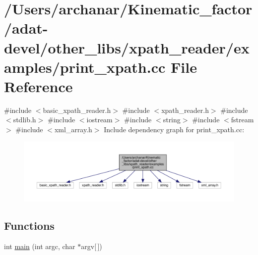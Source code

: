 \hypertarget{adat-devel_2other__libs_2xpath__reader_2examples_2print__xpath_8cc}{}\section{/\+Users/archanar/\+Kinematic\+\_\+factor/adat-\/devel/other\+\_\+libs/xpath\+\_\+reader/examples/print\+\_\+xpath.cc File Reference}
\label{adat-devel_2other__libs_2xpath__reader_2examples_2print__xpath_8cc}
{\ttfamily \#include $<$basic\+\_\+xpath\+\_\+reader.\+h$>$}\newline
{\ttfamily \#include $<$xpath\+\_\+reader.\+h$>$}\newline
{\ttfamily \#include $<$stdlib.\+h$>$}\newline
{\ttfamily \#include $<$iostream$>$}\newline
{\ttfamily \#include $<$string$>$}\newline
{\ttfamily \#include $<$fstream$>$}\newline
{\ttfamily \#include $<$xml\+\_\+array.\+h$>$}\newline
Include dependency graph for print\+\_\+xpath.\+cc\+:
\nopagebreak
\begin{figure}[H]
\begin{center}
\leavevmode
\includegraphics[width=350pt]{d6/dcb/adat-devel_2other__libs_2xpath__reader_2examples_2print__xpath_8cc__incl}
\end{center}
\end{figure}
\subsection*{Functions}
\begin{DoxyCompactItemize}
\item 
int \mbox{\hyperlink{adat-devel_2other__libs_2xpath__reader_2examples_2print__xpath_8cc_a0ddf1224851353fc92bfbff6f499fa97}{main}} (int argc, char $\ast$argv\mbox{[}$\,$\mbox{]})
\end{DoxyCompactItemize}


